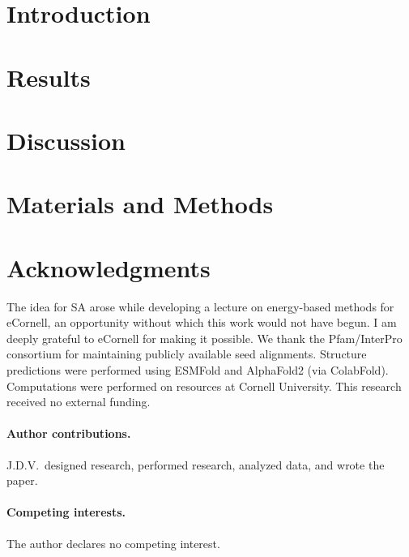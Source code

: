 \documentclass{article}
\theoremstyle{definition}
\theoremstyle{remark}
\begin{document}
\section{Introduction}


\section{Results}


\section{Discussion}


\section{Materials and Methods}



\section*{Acknowledgments}
The idea for SA arose while developing a lecture on energy-based methods for eCornell, an opportunity without which this work would not have begun. I am deeply grateful to eCornell for making it possible. We thank the Pfam/InterPro consortium for maintaining publicly available seed alignments. Structure predictions were performed using ESMFold and AlphaFold2 (via ColabFold). Computations were performed on resources at Cornell University. This research received no external funding.

\paragraph{Author contributions.} J.D.V.\ designed research, performed research, analyzed data, and wrote the paper.

\paragraph{Competing interests.} The author declares no competing interest.
\end{document}
